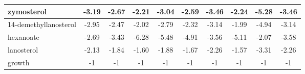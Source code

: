 \begin{table}[H]
\begin{center}
{\begin{tabular}{|l|c|c|c|c|c|c|c|c|c|}
zymosterol                                                                        & -3.19  & -2.67  & -2.21  & -3.04   & -2.59  & -3.46  & -2.24  & -5.28   & -3.46   \\ \hline
14-demethyllanosterol                                                             & -2.95  & -2.47  & -2.02  & -2.79   & -2.32  & -3.14  & -1.99  & -4.94   & -3.14   \\ \hline
hexanoate                                                                         & -2.69  & -3.43  & -6.28  & -5.48   & -4.91  & -3.56  & -5.11  & -2.07   & -3.58   \\ \hline
lanosterol                                                                        & -2.13  & -1.84  & -1.60  & -1.88   & -1.67  & -2.26  & -1.57  & -3.31   & -2.26   \\ \hline
growth                                                                            & -1     & -1     & -1     & -1      & -1     & -1     & -1     & -1      & -1      \\ \hline
\end{tabular}}
\label{table:fba_shadowprices_free_table}
\end{center}
\end{table}
